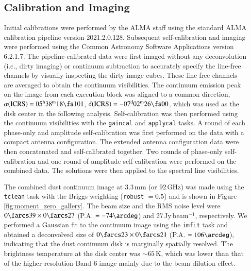\documentclass[linenumbers, twocolumn, twocolappendix, astrosymb, times]{aastex631}
\begin{document}
\subsection{Calibration and Imaging}
Initial calibrations were performed by the ALMA staff using the standard ALMA calibration pipeline version 2021.2.0.128. Subsequent self-calibration and imaging were performed using the Common Astronomy Software Applications \citep[CASA;][]{CASA} version 6.2.1.7. The pipeline-calibrated data were first imaged without any deconvolution (i.e., dirty imaging) or continuum subtraction to accurately specify the line-free channels by visually inspecting the dirty image cubes. These line-free channels are averaged to obtain the continuum visibilities. \textrm{The continuum emission peak on the image from each execution block was aligned to a common direction, $\alpha\mathrm{(ICRS)}= 05^\mathrm{h}38^\mathrm{m}18\fs101$, $\delta\mathrm{(ICRS)} = -07^\mathrm{d}02^\mathrm{m}26\fs00$,
which was used as the disk center in the following analysis.} Self-calibration was then performed using the continuum visibilities with the \texttt{gaincal} and \texttt{applycal} tasks. A round of each phase-only and amplitude self-calibration was first performed on the data with a compact antenna configuration. The extended antenna configuration data were then concatenated and self-calibrated together. Two rounds of phase-only self-calibration and one round of amplitude self-calibration were performed on the combined data. The solutions were then applied to the spectral line visibilities.

\textrm{The combined dust continuum image at 3.3\,mm (or 92\,GHz) was made using the \texttt{tclean} task with the Briggs weighting (\texttt{robust} $=0.5$) and is shown in Figure \ref{fig:moment_zero_gallery}. The beam size and the RMS noise level were $0\farcs39\times0\farcs27$ (P.A. $= -74\arcdeg$) and 27\,\textmu Jy\,beam$^{-1}$, respectively. We performed a Gaussian fit to the continuum image using the \texttt{imfit} task and obtained a deconvolved size of $0\farcs23\times0\farcs21$ (P.A. $= 106\arcdeg$), indicating that the dust continuum disk is marginally spatially resolved. The brightness temperature at the disk center was $\sim65$\,K, which was lower than that of the higher-resolution Band 6 image \citep{Cieza2016} mainly due to the beam dilution effect.}
\end{document}
